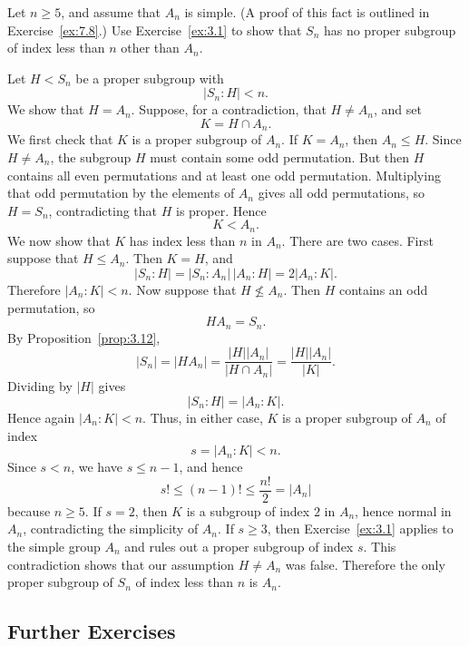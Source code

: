 \documentclass[../Odyssey_Project.tex]{subfiles}
\begin{document}
\begin{exercise}
\label{ex:3.8}
Let $n \geq 5$, and assume that $A_n$ is simple. (A proof of this fact is outlined in Exercise~\ref{ex:7.8}.) Use Exercise~\ref{ex:3.1} to show that $S_n$ has no proper subgroup of index less than $n$ other than $A_n$.
\end{exercise}
\begin{solution}
    Let $H < S_n$ be a proper subgroup with
    \[
        |S_n : H| < n.
    \]
    We show that $H = A_n$.
    Suppose, for a contradiction, that $H \neq A_n$, and set
    \[
        K = H \cap A_n.
    \]
    We first check that $K$ is a proper subgroup of $A_n$. If $K = A_n$, then $A_n \leq H$. Since $H \neq A_n$, the subgroup $H$ must contain some odd permutation. But then $H$ contains all even permutations and at least one odd permutation. Multiplying that odd permutation by the elements of $A_n$ gives all odd permutations, so $H = S_n$, contradicting that $H$ is proper. Hence
    \[
        K < A_n.
    \]
    We now show that $K$ has index less than $n$ in $A_n$. There are two cases.
    First suppose that $H \leq A_n$. Then $K = H$, and
    \[
        |S_n : H|
        =
        |S_n : A_n|\,|A_n : H|
        =
        2|A_n : K|.
    \]
    Therefore $|A_n : K| < n$.
    Now suppose that $H \nleq A_n$. Then $H$ contains an odd permutation, so
    \[
        HA_n = S_n.
    \]
    By Proposition~\ref{prop:3.12},
    \[
        |S_n|
        =
        |HA_n|
        =
        \frac{|H||A_n|}{|H \cap A_n|}
        =
        \frac{|H||A_n|}{|K|}.
    \]
    Dividing by $|H|$ gives
    \[
        |S_n : H|
        =
        |A_n : K|.
    \]
    Hence again $|A_n : K| < n$.
    Thus, in either case, $K$ is a proper subgroup of $A_n$ of index
    \[
        s = |A_n : K| < n.
    \]
    Since $s < n$, we have $s \leq n-1$, and hence
    \[
        s! \leq (n-1)! \leq \frac{n!}{2} = |A_n|
    \]
    because $n \geq 5$. If $s = 2$, then $K$ is a subgroup of index $2$ in $A_n$, hence normal in $A_n$, contradicting the simplicity of $A_n$. If $s \geq 3$, then Exercise~\ref{ex:3.1} applies to the simple group $A_n$ and rules out a proper subgroup of index $s$.
    This contradiction shows that our assumption $H \neq A_n$ was false. Therefore the only proper subgroup of $S_n$ of index less than $n$ is $A_n$.
\end{solution}

\subsection*{Further Exercises}
\end{document}
